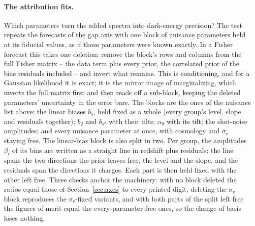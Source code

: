 \documentclass[11pt]{article}
\newcommand{\sv}{\sigma_v}
\begin{document}
\paragraph{The attribution fits.}
Which parameters turn the added spectra into dark-energy precision?
The test repeats the forecasts of the gap axis with one block of
nuisance parameters held at its fiducial values, as if those
parameters were known exactly.  In a Fisher forecast this takes one
deletion: remove the block's rows and columns from the full Fisher
matrix -- the data term plus every prior, the correlated prior of
the bias residuals included -- and invert what remains.  This is
conditioning, and for a Gaussian likelihood it is exact; it is the
mirror image of marginalizing, which inverts the full matrix first
and then reads off a sub-block, keeping the deleted parameters'
uncertainty in the error bars.  The blocks are the ones of the
nuisance list above: the linear biases $b_1$, held fixed as a whole
(every group's level, slope and residuals together); $b_2$ and
$b_{s^2}$ with their tilts; $\alpha_0$ with its tilt; the shot-noise
amplitudes; and every nuisance parameter at once, with cosmology and
$\sv$ staying free.  The linear-bias block is also split in two.
Per group, the amplitudes $\beta_i$ of its bins are written as a
straight line in redshift plus residuals: the line spans the two
directions the
prior leaves free, the level and the slope, and the residuals span
the directions it charges.  Each part is then held fixed with the
other left free.  Three checks anchor the machinery: with no block
deleted the ratios equal those of Section~\ref{sec:axes} to every
printed digit, deleting the $\sv$ block reproduces the $\sv$-fixed
variants, and with both parts of the split left free the figures of
merit equal the every-parameter-free ones, so the change of basis
loses nothing.
\end{document}
